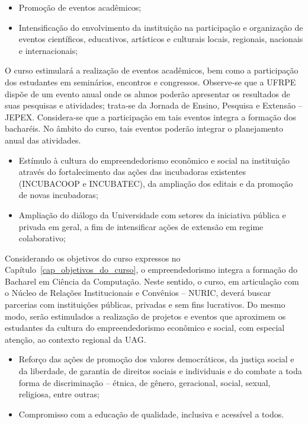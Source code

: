 \documentclass[
	12pt,				%
	openright,			%
  oneside,     %
	a4paper,			%
	chapter=TITLE,		%
	english,			%
	french,				%
	spanish,			%
	brazil				%
	]{abntex2}
\begin{document}
\begin{itemize}
	\item Promoção de eventos acadêmicos;
	\item Intensificação do envolvimento da instituição na participação e organização de eventos científicos, educativos, artísticos e culturais locais, regionais, nacionais e internacionais;
\end{itemize}

O curso estimulará a realização de eventos acadêmicos, bem como a participação dos estudantes em seminários, encontros e congressos. Observe-se que a UFRPE dispõe de um evento anual onde os alunos poderão apresentar os resultados de suas pesquisas e atividades; trata-se da Jornada de Ensino, Pesquisa e Extensão – JEPEX. Considera-se que a participação em tais eventos integra a formação dos bacharéis. No âmbito do curso, tais eventos poderão integrar o planejamento anual das atividades.	 	 	

\begin{itemize}
	\item Estímulo à cultura do empreendedorismo econômico e social na instituição através do fortalecimento das ações das incubadoras existentes (INCUBACOOP e INCUBATEC), da ampliação dos editais e da promoção de novas incubadoras; 	
	\item Ampliação do diálogo da Universidade com setores da iniciativa pública e privada em geral, a fim de intensificar ações de extensão em regime colaborativo;
\end{itemize}

Considerando os objetivos do curso expressos no Capítulo~\ref{cap_objetivos_do_curso}, o empreendedorismo integra a formação do Bacharel em Ciência da Computação. Neste sentido, o curso, em articulação com o Núcleo de Relações Institucionais e Convênios – NURIC, deverá buscar parcerias com instituições públicas, privadas e sem fins lucrativos. Do mesmo modo, serão estimulados a realização de projetos e eventos que aproximem os estudantes da cultura do empreendedorismo econômico e social, com especial atenção, ao contexto regional da UAG.	 	 	

\begin{itemize}
	\item Reforço das ações de promoção dos valores democráticos, da justiça social e da liberdade, de garantia de direitos sociais e individuais e do combate a toda forma de discriminação – étnica, de gênero, geracional, social, sexual, religiosa, entre outras;
	\item Compromisso com a educação de qualidade, inclusiva e acessível a todos.
\end{itemize}
\end{document}
